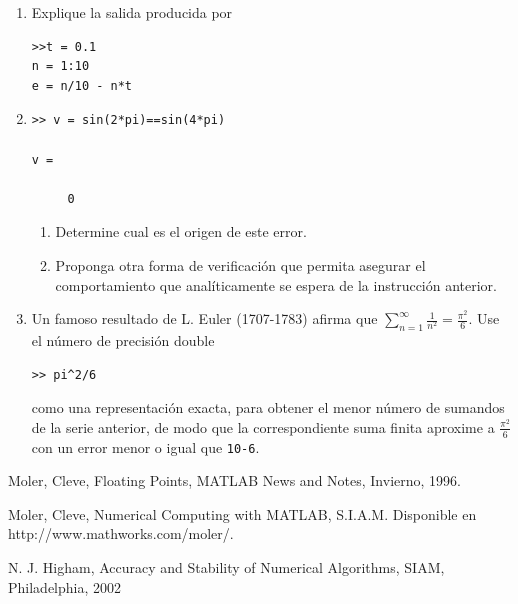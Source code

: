 \documentclass[11pt]{article}
\begin{document}
\begin{enumerate}
\item Explique la salida producida por
\begin{verbatim}
>>t = 0.1
n = 1:10
e = n/10 - n*t
\end{verbatim}


\item 

\begin{verbatim}
>> v = sin(2*pi)==sin(4*pi)

v =

     0
\end{verbatim}

\begin{enumerate}
\item Determine cual es el origen de este error.

\item Proponga otra forma de verificación que permita asegurar el comportamiento que anal\'iticamente se espera de la instrucci\'on anterior.

\end{enumerate}

\item Un famoso resultado de L. Euler (1707-1783) afirma que
$ \displaystyle \sum_{n=1}^\infty \frac{1}{n^2} = \frac{\pi^2}{6}$.
Use el n\'umero de precisi\'on double 
\begin{verbatim}
>> pi^2/6
\end{verbatim}
como una representaci\'on exacta, para obtener 
el menor número de sumandos de la serie anterior, de modo que la correspondiente
suma finita aproxime a $\frac{\pi^2}{6}$ con un error menor o igual que \texttt{10-6}.

\end{enumerate}


\begin{thebibliography}{9}

 Moler, Cleve, Floating Points, MATLAB News and Notes, Invierno, 1996. 

 Moler, Cleve, Numerical Computing with MATLAB, S.I.A.M. Disponible en http://www.mathworks.com/moler/.

 N. J. Higham, Accuracy and Stability of Numerical Algorithms, SIAM, Philadelphia, 2002
\end{thebibliography}
\end{document}
